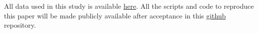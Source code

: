 \documentclass[twocolumn]{aastex63}
\newcommand{\floor}[1]{\textbf{\textcolor{magenta}{[Floor: #1]}}}
\newcommand\bhnsSingle{BHNS\xspace}
\begin{document}
All data used in this study is  available  \href{http://www.broekgaarden.nl/floor/wordpress/}{here}. All the scripts and code to reproduce this paper will be made publicly available after acceptance in  this \href{https://github.com/FloorBroekgaarden/BHNS_project}{github} repository. 


%




\end{document}
